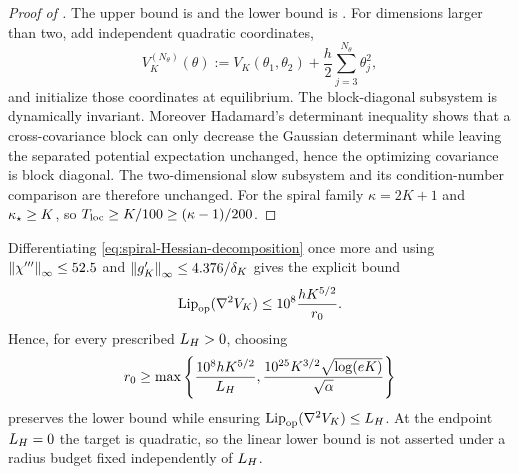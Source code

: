 \begin{proof}[Proof of ]
    The upper bound is  and the lower bound is . For
    dimensions larger than two, add independent quadratic coordinates,
    \begin{equation*}
        V_K^{(N_\theta)}(\theta):=V_K(\theta_1,\theta_2)+\frac h2\sum_{j=3}^{N_\theta}\theta_j^2,
    \end{equation*}
    and initialize those coordinates at equilibrium. The block-diagonal subsystem is
    dynamically invariant. Moreover Hadamard's determinant inequality shows that a
    cross-covariance block can only decrease the Gaussian determinant while leaving the
    separated potential expectation unchanged, hence the optimizing covariance is block
    diagonal. The two-dimensional slow subsystem and its condition-number comparison are
    therefore unchanged. For the spiral family $\kappa=2K+1$ and $\kappa_\star\geq K$, so
    $T_{\mathrm{loc}}\geq K/100\geq(\kappa-1)/200$.
\end{proof}

\begin{remark}
    Differentiating \eqref{eq:spiral-Hessian-decomposition} once more and using
    $\left\lVert \chi'''\right\rVert_\infty\leq52.5$ and $\left\lVert g_K'\right\rVert_\infty\leq4.376/\delta_K$ gives the
    explicit bound
    \begin{equation*}
        \operatorname{Lip}_{\mathrm{op}}(\nabla^2V_K)\leq10^8\frac{hK^{5/2}}{r_0}.
    \end{equation*}
    Hence, for every prescribed $L_H>0$, choosing
    \begin{equation*}
        r_0\geq
        \max\left\{
            \frac{10^8hK^{5/2}}{L_H},
            \frac{10^{25}K^{3/2}\sqrt{\log(eK)}}{\sqrt\alpha}
        \right\}
    \end{equation*}
    preserves the lower bound while ensuring $\operatorname{Lip}_{\mathrm{op}}(\nabla^2V_K)\leq L_H$. At the endpoint
    $L_H=0$ the target is quadratic, so the linear lower bound is not asserted under a radius
    budget fixed independently of $L_H$.
\end{remark}

